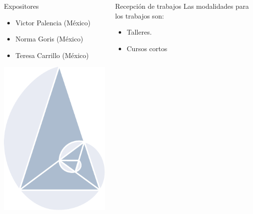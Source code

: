 \documentclass[svgnames,table, x11names, 11pt]{beamer}
\begin{document}
\begin{frame}[fragile]{}
\begin{columns}[t]
\begin{column}{0.33\textwidth}
\begin{block}{Expositores}
\begin{itemize}
\item Victor Palencia (México)

\item Norma Goris (México)

\item Teresa Carrillo (México)
\end{itemize}

				\end{block}

\vspace{-5cm}
				\hspace*{-5cm}
				\includegraphics[scale=2, angle=30]{IconoCIEMACTransparente}

\end{column}
\begin{column}{0.66\textwidth}
		\begin{columns}[t]
			\begin{column}{0.5\textwidth}
				\begin{block}{Recepción de trabajos}
Las modalidades para los trabajos son:

\begin{itemize}
\item Talleres.

\item Cursos cortos


\end{itemize}
\end{block}
\end{column}
\end{columns}
\end{column}
\end{columns}
\end{frame}
\end{document}
